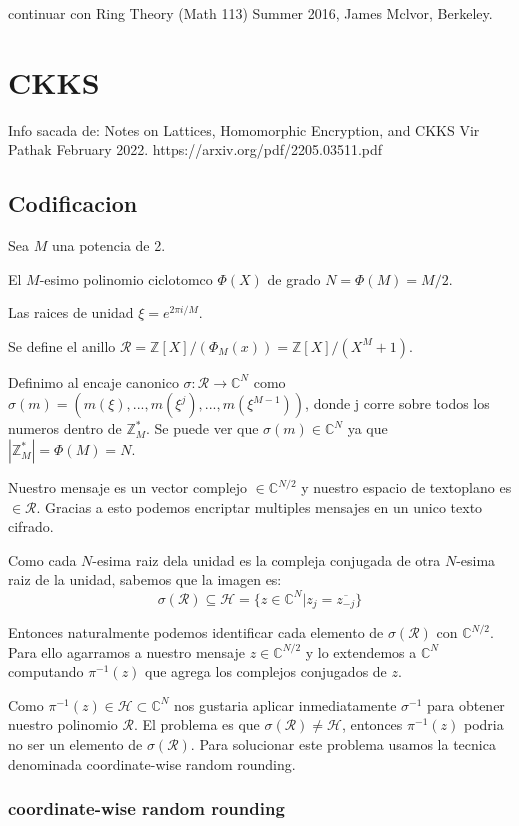 \documentclass[12pt, oneside]{article}
\newcommand{\Hc}{\mathcal{H}}
\newcommand{\Rc}{\mathcal{R}}
\newcommand{\C}{\mathbb{C}}
\newcommand{\Z}{\mathbb{Z}}
\begin{document}
continuar con Ring Theory (Math 113) Summer 2016, James Mclvor, Berkeley.

\section{CKKS}
Info sacada de:
Notes on Lattices, Homomorphic Encryption, and CKKS
Vir Pathak
February 2022.
https://arxiv.org/pdf/2205.03511.pdf
\subsection{Codificacion}
Sea $M$ una potencia de 2.

El $M$-esimo polinomio ciclotomco $\Phi(X)$ de grado $N=\Phi(M)=M/2$.

Las raices de unidad $\xi=e^{2\pi i/M}$.

Se define el anillo $\Rc=\Z[X]/(\Phi_M(x))=\Z[X]/(X^M+1)$.

Definimo al encaje canonico $\sigma: \Rc\to\C^N$ como
$\sigma(m)=(m(\xi),...,m(\xi^j),...,m(\xi^{M-1}))$, donde j corre sobre todos los
numeros dentro de $\Z^*_M$.
Se puede ver que $\sigma(m)\in\C^N$ ya que $|\Z^*_M|=\Phi(M)=N$.

Nuestro mensaje es un vector complejo $\in\C^{N/2}$ y nuestro espacio de textoplano
es $\in\Rc$.
Gracias a esto podemos encriptar multiples mensajes en un unico texto cifrado.

Como cada $N$-esima raiz dela unidad es la compleja conjugada de otra
$N$-esima raiz de la unidad, sabemos que la imagen es:
\begin{equation*}
\sigma(\Rc)\subseteq\Hc=\{z\in\C^N|z_j=\overline{z_{-j}}\}
\end{equation*}

Entonces naturalmente podemos identificar cada elemento de $\sigma(\Rc)$ con $\C^{N/2}$.
Para ello agarramos a nuestro mensaje $z\in\C^{N/2}$ y lo extendemos a $\C^N$ computando
$\pi^{-1}(z)$ que agrega los complejos conjugados de $z$.

Como $\pi^{-1}(z)\in\Hc\subset\C^N$ nos gustaria aplicar inmediatamente $\sigma^{-1}$ para obtener nuestro
polinomio $\Rc$.
El problema es que $\sigma(\Rc)\neq\Hc$, entonces $\pi^{-1}(z)$ podria no ser un elemento de
$\sigma(\Rc)$.
Para solucionar este problema usamos la tecnica denominada coordinate-wise random rounding.
\subsubsection*{coordinate-wise random rounding}
\end{document}
